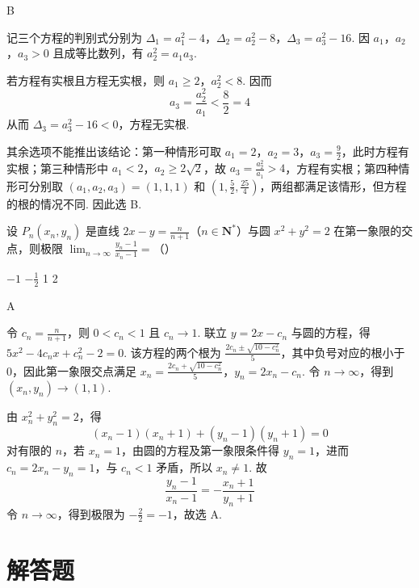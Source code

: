 \begin{answer}
B
\end{answer}

\begin{solution}
记三个方程的判别式分别为 \(\Delta_1=a_1^2-4\)，\(\Delta_2=a_2^2-8\)，\(\Delta_3=a_3^2-16\).
因 \(a_1\)，\(a_2\)，\(a_3>0\) 且成等比数列，有 \(a_2^2=a_1a_3\).

若方程有实根且方程无实根，则 \(a_1\geqslant2\)，\(a_2^2<8\). 因而
\[
a_3=\frac{a_2^2}{a_1}<\frac8{2}=4
\]
从而 \(\Delta_3=a_3^2-16<0\)，方程无实根.

其余选项不能推出该结论：第一种情形可取 \(a_1=2\)，\(a_2=3\)，\(a_3=\frac92\)，此时方程有实根；第三种情形中 \(a_1<2\)，\(a_2\geqslant2\sqrt2\)，故 \(a_3=\frac{a_2^2}{a_1}>4\)，方程有实根；第四种情形可分别取 \((a_1,a_2,a_3)=(1,1,1)\) 和 \(\left(1,\frac52,\frac{25}{4}\right)\)，两组都满足该情形，但方程的根的情况不同. 因此选 B.
\end{solution}

\begin{problem}
设 \(P_{n}(x_{n}, y_{n})\) 是直线 \(2x - y = \frac{n}{n + 1}\)（\(n \in \mathbf{N}^{*}\)）与圆 \(x^{2} + y^{2} = 2\) 在第一象限的交点，则极限 \(\displaystyle\lim_{n \to \infty} \frac{y_{n} - 1}{x_{n} - 1} =\)（\quad）

\choices
    {\(-1\)}
    {\(-\frac{1}{2}\)}
    {1}
    {2}
\end{problem}

\begin{answer}
A
\end{answer}

\begin{solution}
令 \(c_n=\frac{n}{n+1}\)，则 \(0<c_n<1\) 且 \(c_n\to1\). 联立 \(y=2x-c_n\) 与圆的方程，得 \(5x^2-4c_nx+c_n^2-2=0\). 该方程的两个根为 \(\frac{2c_n\pm\sqrt{10-c_n^2}}5\)，其中负号对应的根小于0，因此第一象限交点满足
\(x_n=\frac{2c_n+\sqrt{10-c_n^2}}5\)，\(y_n=2x_n-c_n\).
令 \(n\to\infty\)，得到 \((x_n,y_n)\to(1,1)\).

由 \(x_n^2+y_n^2=2\)，得
\[
(x_n-1)(x_n+1)+(y_n-1)(y_n+1)=0
\]
对有限的 \(n\)，若 \(x_n=1\)，由圆的方程及第一象限条件得 \(y_n=1\)，进而 \(c_n=2x_n-y_n=1\)，与 \(c_n<1\) 矛盾，所以 \(x_n\neq1\). 故
\[
\frac{y_n-1}{x_n-1}=-\frac{x_n+1}{y_n+1}
\]
令 \(n\to\infty\)，得到极限为 \(-\frac{2}{2}=-1\)，故选 A.
\end{solution}

\section{解答题}

